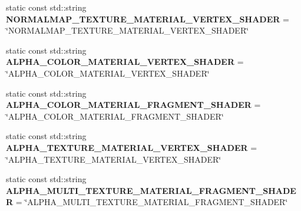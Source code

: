 \begin{DoxyCompactItemize}
static const std\+::string {\bfseries N\+O\+R\+M\+A\+L\+M\+A\+P\+\_\+\+T\+E\+X\+T\+U\+R\+E\+\_\+\+M\+A\+T\+E\+R\+I\+A\+L\+\_\+\+V\+E\+R\+T\+E\+X\+\_\+\+S\+H\+A\+D\+ER} = \char`\"{}N\+O\+R\+M\+A\+L\+M\+A\+P\+\_\+\+T\+E\+X\+T\+U\+R\+E\+\_\+\+M\+A\+T\+E\+R\+I\+A\+L\+\_\+\+V\+E\+R\+T\+E\+X\+\_\+\+S\+H\+A\+D\+ER\char`\"{}
\item 
\mbox{\label{struct_geometry_engine_1_1_geometry_material_1_1_material_constants_ab64f75f3b442344dc0225a97065d054b}} 
static const std\+::string {\bfseries A\+L\+P\+H\+A\+\_\+\+C\+O\+L\+O\+R\+\_\+\+M\+A\+T\+E\+R\+I\+A\+L\+\_\+\+V\+E\+R\+T\+E\+X\+\_\+\+S\+H\+A\+D\+ER} = \char`\"{}A\+L\+P\+H\+A\+\_\+\+C\+O\+L\+O\+R\+\_\+\+M\+A\+T\+E\+R\+I\+A\+L\+\_\+\+V\+E\+R\+T\+E\+X\+\_\+\+S\+H\+A\+D\+ER\char`\"{}
\item 
\mbox{\label{struct_geometry_engine_1_1_geometry_material_1_1_material_constants_a0ba0f888f516244462202ce04765c8e1}} 
static const std\+::string {\bfseries A\+L\+P\+H\+A\+\_\+\+C\+O\+L\+O\+R\+\_\+\+M\+A\+T\+E\+R\+I\+A\+L\+\_\+\+F\+R\+A\+G\+M\+E\+N\+T\+\_\+\+S\+H\+A\+D\+ER} = \char`\"{}A\+L\+P\+H\+A\+\_\+\+C\+O\+L\+O\+R\+\_\+\+M\+A\+T\+E\+R\+I\+A\+L\+\_\+\+F\+R\+A\+G\+M\+E\+N\+T\+\_\+\+S\+H\+A\+D\+ER\char`\"{}
\item 
\mbox{\label{struct_geometry_engine_1_1_geometry_material_1_1_material_constants_a164b22bf9a3cd7887271aecad1cbd283}} 
static const std\+::string {\bfseries A\+L\+P\+H\+A\+\_\+\+T\+E\+X\+T\+U\+R\+E\+\_\+\+M\+A\+T\+E\+R\+I\+A\+L\+\_\+\+V\+E\+R\+T\+E\+X\+\_\+\+S\+H\+A\+D\+ER} = \char`\"{}A\+L\+P\+H\+A\+\_\+\+T\+E\+X\+T\+U\+R\+E\+\_\+\+M\+A\+T\+E\+R\+I\+A\+L\+\_\+\+V\+E\+R\+T\+E\+X\+\_\+\+S\+H\+A\+D\+ER\char`\"{}
\item 
\mbox{\label{struct_geometry_engine_1_1_geometry_material_1_1_material_constants_a438143cf8672c48debeaed2944a81901}} 
static const std\+::string {\bfseries A\+L\+P\+H\+A\+\_\+\+M\+U\+L\+T\+I\+\_\+\+T\+E\+X\+T\+U\+R\+E\+\_\+\+M\+A\+T\+E\+R\+I\+A\+L\+\_\+\+F\+R\+A\+G\+M\+E\+N\+T\+\_\+\+S\+H\+A\+D\+ER} = \char`\"{}A\+L\+P\+H\+A\+\_\+\+M\+U\+L\+T\+I\+\_\+\+T\+E\+X\+T\+U\+R\+E\+\_\+\+M\+A\+T\+E\+R\+I\+A\+L\+\_\+\+F\+R\+A\+G\+M\+E\+N\+T\+\_\+\+S\+H\+A\+D\+ER\char`\"{}

\end{DoxyCompactItemize}
